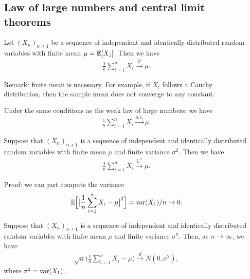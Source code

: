 \documentclass[11pt,letterpaper]{article}
\begin{document}
\subsection{Law of large numbers and central limit theorems}
\begin{theorem}
  Let $(X_n)_{n \geq 1}$ be a sequence of independent and identically distributed random variables with finite mean $\mu = {\mathbb{E}}[X_1]$. Then we have
  \begin{align*}
    \frac{1}{n} \sum_{i=1}^n X_i \xrightarrow{p} \mu.
  \end{align*}
\end{theorem}
Remark: finite mean is necessary. For example, if $X_i$ follows a Cauchy distribution, then the sample mean does not converge to any constant.

\begin{theorem}
  Under the same conditions as the weak law of large numbers, we have
  \begin{align*}
    \frac{1}{n} \sum_{i=1}^n X_i \xrightarrow{a.s.} \mu.
  \end{align*}
\end{theorem}

\begin{proposition}
  Suppose that $(X_n)_{n \geq 1}$ is a sequence of independent and identically distributed random variables with finite mean $\mu$ and finite variance $\sigma^2$. Then we have
  \begin{align*}
   \frac{1}{n} \sum_{i = 1}^n X_i \xrightarrow{\mathbb{L}^2} \mu.
  \end{align*}
\end{proposition}
Proof: we can just compute the variance
\begin{align*}
  {\mathbb{E}} \Big[ \big| \frac{1}{n} \sum_{i = 1}^n X_i - \mu \big|^2 \Big] = \operatorname{var} (X_1) / n \to 0.
\end{align*}

\begin{theorem}
  Suppose that $(X_n)_{n \geq 1}$ is a sequence of independent and identically distributed random variables with finite mean $\mu$ and finite variance $\sigma^2$. Then, as $n \to \infty$, we have
  \begin{align*}
    \sqrt{n}\Big(\frac{1}{n} \sum_{i=1}^n X_i -  \mu\Big) \xrightarrow{d} N(0,\sigma^2),
  \end{align*}
  where $\sigma^2 = \operatorname{var}(X_1)$.
\end{theorem}
\end{document}
